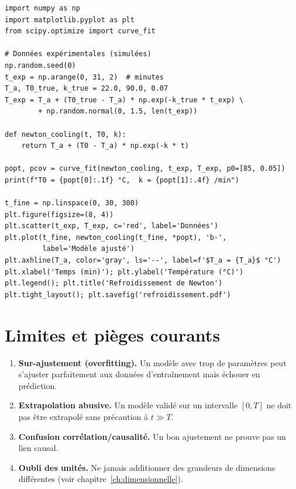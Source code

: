 \begin{codeblock}[title=\textbf{Simulation et ajustement --- refroidissement}]
\begin{verbatim}
import numpy as np
import matplotlib.pyplot as plt
from scipy.optimize import curve_fit

# Données expérimentales (simulées)
np.random.seed(0)
t_exp = np.arange(0, 31, 2)  # minutes
T_a, T0_true, k_true = 22.0, 90.0, 0.07
T_exp = T_a + (T0_true - T_a) * np.exp(-k_true * t_exp) \
        + np.random.normal(0, 1.5, len(t_exp))

def newton_cooling(t, T0, k):
    return T_a + (T0 - T_a) * np.exp(-k * t)

popt, pcov = curve_fit(newton_cooling, t_exp, T_exp, p0=[85, 0.05])
print(f"T0 = {popt[0]:.1f} °C,  k = {popt[1]:.4f} /min")

t_fine = np.linspace(0, 30, 300)
plt.figure(figsize=(8, 4))
plt.scatter(t_exp, T_exp, c='red', label='Données')
plt.plot(t_fine, newton_cooling(t_fine, *popt), 'b-',
         label='Modèle ajusté')
plt.axhline(T_a, color='gray', ls='--', label=f'$T_a = {T_a}$ °C')
plt.xlabel('Temps (min)'); plt.ylabel('Température (°C)')
plt.legend(); plt.title('Refroidissement de Newton')
plt.tight_layout(); plt.savefig('refroidissement.pdf')
\end{verbatim}
\end{codeblock}

\section{Limites et pi\`eges courants}

\begin{attention}[title=\textbf{Pi\`eges \`a \'eviter}]
\begin{enumerate}
  \item \textbf{Sur-ajustement (overfitting).}
    Un mod\`ele avec trop de param\`etres peut s'ajuster parfaitement
    aux donn\'ees d'entra\^inement mais \'echouer en pr\'ediction.
  \item \textbf{Extrapolation abusive.}
    Un mod\`ele valid\'e sur un intervalle $[0,T]$ ne doit pas \^etre
    extrapol\'e sans pr\'ecaution \`a $t\gg T$.
  \item \textbf{Confusion corr\'elation/causalit\'e.}
    Un bon ajustement ne prouve pas un lien causal.
  \item \textbf{Oubli des unit\'es.}
    Ne jamais additionner des grandeurs de dimensions diff\'erentes
    (voir chapitre~\ref{ch:dimensionnelle}).
\end{enumerate}
\end{attention}

